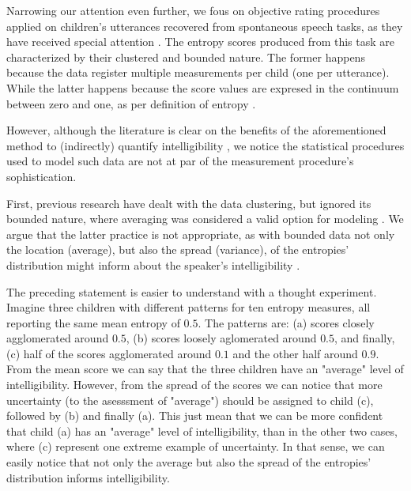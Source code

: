 Narrowing our attention even further, we fous on objective rating procedures applied on children's utterances recovered from spontaneous speech tasks, as they have received special attention \citep{Boonen_et_al_2021, Hustad_et_al_2020}. The entropy scores produced from this task are characterized by their clustered and bounded nature. The former happens because the data register multiple measurements per child (one per utterance). While the latter happens because the score values are expresed in the continuum between zero and one, as per definition of entropy \citep{Shannon_1948}.

\begin{comment}	
	
	Moreover, the previous advantages are further emphasized by the use of stimuli gathered from spontaneous speech tasks, as they have a greater level of ecological validity, especially compared to contextualized utterances or reading at loud tasks \citep{Flipsen_2006, Ertmer_2011}.
	
\end{comment}

However, although the literature is clear on the benefits of the aforementioned method to (indirectly) quantify intelligibility \citep{Boonen_et_al_2020, Boonen_et_al_2021, Hustad_et_al_2020}, we notice the statistical procedures used to model such data are not at par of the measurement procedure's sophistication.

First, previous research have dealt with the data clustering, but ignored its bounded nature, where averaging was considered a valid option for modeling \citep{Boonen_et_al_2021}. We argue that the latter practice is not appropriate, as with bounded data not only the location (average), but also the spread (variance), of the entropies' distribution might inform about the speaker's intelligibility \citep{Nelder_et_al_1983}.

The preceding statement is easier to understand with a thought experiment. Imagine three children with different patterns for ten entropy measures, all reporting the same mean entropy of $0.5$. The patterns are: (a) scores closely agglomerated around $0.5$, (b) scores loosely aglomerated around $0.5$, and finally, (c) half of the scores agglomerated around $0.1$ and the other half around $0.9$. From the mean score we can say that the three children have an "average" level of intelligibility. However, from the spread of the scores we can notice that more uncertainty (to the asesssment of "average") should be assigned to child (c), followed by (b) and finally (a). This just mean that we can be more confident that child (a) has an "average" level of intelligibility, than in the other two cases, where (c) represent one extreme example of uncertainty. In that sense, we can easily notice that not only the average but also the spread of the entropies' distribution informs intelligibility.


